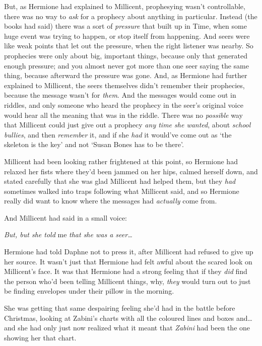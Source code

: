 But, as Hermione had explained to Millicent, prophesying wasn't controllable,
there was no way to \emph{ask} for a prophecy about anything in particular.
Instead (the books had said) there was a sort of \emph{pressure} that built up
in Time, when some huge event was trying to happen, or stop itself from
happening. And seers were like weak points that let out the pressure, when the
right listener was nearby. So prophecies were only about big, important things,
because only that generated enough pressure; and you almost never got more than
one seer saying the same thing, because afterward the pressure was gone. And,
as Hermione had further explained to Millicent, the seers themselves didn't
remember their prophecies, because the message wasn't for \emph{them}. And the
messages would come out in riddles, and only someone who heard the prophecy in
the seer's original voice would hear all the meaning that was in the riddle.
There was no \emph{possible} way that Millicent could just give out a prophecy
\emph{any time she wanted}, about \emph{school bullies}, and then
\emph{remember} it, and if she \emph{had} it would've come out as `the skeleton
is the key' and not `Susan Bones has to be there'.

Millicent had been looking rather frightened at this point, so Hermione had
relaxed her fists where they'd been jammed on her hips, calmed herself down,
and stated carefully that she was glad Millicent had helped them, but they
\emph{had} sometimes walked into traps following what Millicent said, and so
Hermione really did want to know where the messages had \emph{actually} come
from.

And Millicent had said in a small voice:

\emph{But, but she told} me \emph{that she was a seer{\ldots}}

Hermione had told Daphne not to press it, after Millicent had refused to give
up her source. It wasn't just that Hermione had felt awful about the scared
look on Millicent's face. It was that Hermione had a strong feeling that if
they \emph{did} find the person who'd been telling Millicent things, why,
\emph{they} would turn out to just be finding envelopes under their pillow in
the morning.

She was getting that same despairing feeling she'd had in the battle before
Christmas, looking at Zabini's charts with all the coloured lines and boxes
and{\ldots} and she had only just now realized what it meant that \emph{Zabini}
had been the one showing her that chart.

